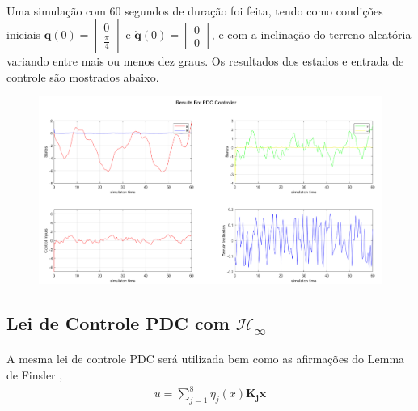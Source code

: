 \documentclass[a4paper,10pt]{article}
\begin{document}
\paragraph{}Uma simulação com 60 segundos de duração foi feita, tendo como condições iniciais $\bm{q}(0) = \begin{bmatrix}
	0 \\ \frac{\pi}{4}
\end{bmatrix}$ e $\dot{\bm{q}}(0) = \begin{bmatrix}
0 \\ 0
\end{bmatrix}$, e com a inclinação do terreno aleatória variando entre mais ou menos dez graus. Os resultados dos estados e entrada de controle são mostrados abaixo.

\begin{figure}[H]
	\centering
	\includegraphics[scale = 0.5]{fig/PDCresult}
\end{figure}


\newpage
\subsection{Lei de Controle PDC com $\mathcal{H}_\infty$}
\paragraph{}A mesma lei de controle PDC será utilizada bem como as afirmações do Lemma de Finsler ,
\begin{gather}
	\boxed{u = \sum_{j=1}^{8}\eta_j(x)\bm{K_j}\bm{x}}	
\end{gather}
\end{document}
